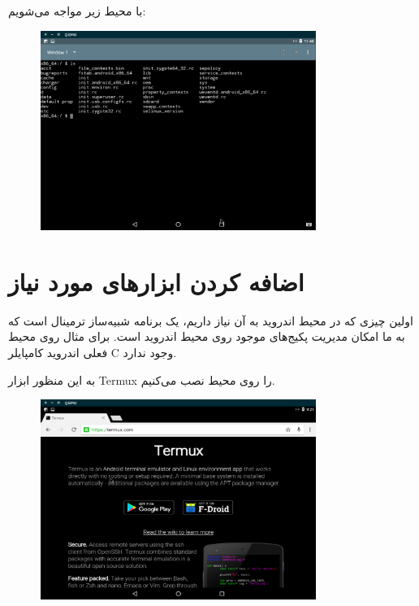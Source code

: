 \documentclass{article}
\begin{document}
با محیط زیر مواجه می‌شویم:

\newpage

\begin{figure}[h]
	\centering	
	\includegraphics[width = 0.8\textwidth]{images/install22.png}
\end{figure}

\section*{اضافه کردن ابزار‌های مورد نیاز}

اولین چیزی که در محیط اندروید به آن نیاز داریم، یک برنامه شبیه‌ساز ترمینال است که به ما امکان مدیریت پکیج‌های موجود روی محیط اندروید است. برای مثال روی محیط فعلی اندروید کامپایلر C وجود ندارد.

به این منظور ابزار Termux را روی محیط نصب می‌‌کنیم.

\begin{figure}[h]
	\centering	
	\includegraphics[width = 0.8\textwidth]{images/package1.png}
\end{figure}
\end{document}
